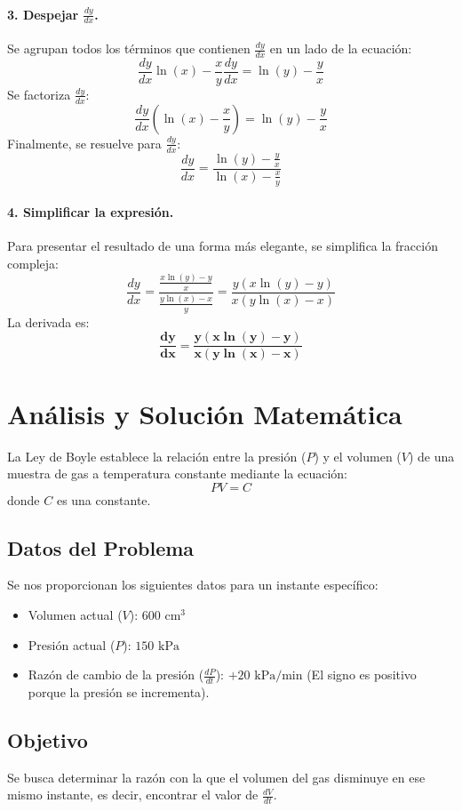 \documentclass[12pt, letterpaper]{article}
\begin{document}
\paragraph{3. Despejar $\frac{dy}{dx}$.}
Se agrupan todos los términos que contienen $\frac{dy}{dx}$ en un lado de la ecuación:
$$
\frac{dy}{dx} \ln(x) - \frac{x}{y} \frac{dy}{dx} = \ln(y) - \frac{y}{x}
$$
Se factoriza $\frac{dy}{dx}$:
$$
\frac{dy}{dx} \left( \ln(x) - \frac{x}{y} \right) = \ln(y) - \frac{y}{x}
$$
Finalmente, se resuelve para $\frac{dy}{dx}$:
$$
\frac{dy}{dx} = \frac{\ln(y) - \frac{y}{x}}{\ln(x) - \frac{x}{y}}
$$

\paragraph{4. Simplificar la expresión.}
Para presentar el resultado de una forma más elegante, se simplifica la fracción compleja:
$$
\frac{dy}{dx} = \frac{\frac{x\ln(y) - y}{x}}{\frac{y\ln(x) - x}{y}} = \frac{y(x\ln(y) - y)}{x(y\ln(x) - x)}
$$
La derivada es:
$$
\mathbf{\frac{dy}{dx} = \frac{y(x\ln(y) - y)}{x(y\ln(x) - x)}}
$$

\section*{Análisis y Solución Matemática}

La Ley de Boyle establece la relación entre la presión ($P$) y el volumen ($V$) de una muestra de gas a temperatura constante mediante la ecuación:
$$
PV = C
$$
donde $C$ es una constante.

\subsection*{Datos del Problema}
Se nos proporcionan los siguientes datos para un instante específico:
\begin{itemize}
    \item Volumen actual ($V$): $600 \text{ cm}^3$
    \item Presión actual ($P$): $150 \text{ kPa}$
    \item Razón de cambio de la presión ($\frac{dP}{dt}$): $+20 \text{ kPa/min}$ (El signo es positivo porque la presión se incrementa).
\end{itemize}

\subsection*{Objetivo}
Se busca determinar la razón con la que el volumen del gas disminuye en ese mismo instante, es decir, encontrar el valor de $\frac{dV}{dt}$.
\end{document}

